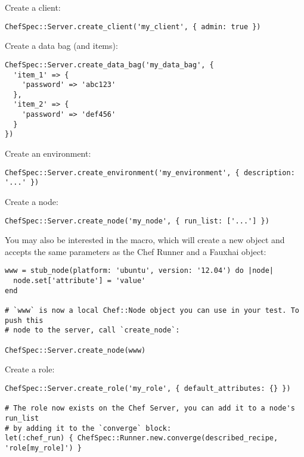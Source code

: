 Create a client:

\begin{lstlisting}[label=lst:testing-chef-zero6]
ChefSpec::Server.create_client('my_client', { admin: true })
\end{lstlisting}

Create a data bag (and items):

\begin{lstlisting}[label=lst:testing-chef-zero7]
ChefSpec::Server.create_data_bag('my_data_bag', {
  'item_1' => {
    'password' => 'abc123'
  },
  'item_2' => {
    'password' => 'def456'
  }
})
\end{lstlisting}

Create an environment:

\begin{lstlisting}[label=lst:testing-chef-zero8]
ChefSpec::Server.create_environment('my_environment', { description: '...' })
\end{lstlisting}

Create a node:

\begin{lstlisting}[label=lst:testing-chef-zero9]
ChefSpec::Server.create_node('my_node', { run_list: ['...'] })
\end{lstlisting}

You may also be interested in the  macro, which will create a new  object and accepts the same parameters as the Chef Runner and a Fauxhai object:

\begin{lstlisting}[label=lst:testing-chef-zero10]
www = stub_node(platform: 'ubuntu', version: '12.04') do |node|
  node.set['attribute'] = 'value'
end

# `www` is now a local Chef::Node object you can use in your test. To push this
# node to the server, call `create_node`:

ChefSpec::Server.create_node(www)
\end{lstlisting}

Create a role:

\begin{lstlisting}[label=lst:testing-chef-zero11]
ChefSpec::Server.create_role('my_role', { default_attributes: {} })

# The role now exists on the Chef Server, you can add it to a node's run_list
# by adding it to the `converge` block:
let(:chef_run) { ChefSpec::Runner.new.converge(described_recipe, 'role[my_role]') }
\end{lstlisting}


